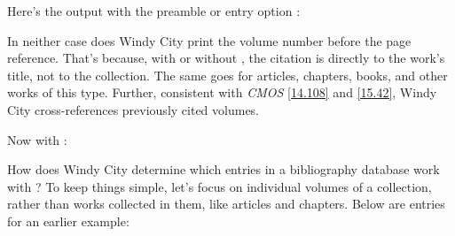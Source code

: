 \documentclass[11pt,letterpaper,oneside]{article}
\begin{document}
\begin{citebib}
\item \cite[169--71]{king2014}
\item \cite[170]{king2014}
\end{citebib}

\noindent Here's the output with the preamble or entry option
:

\begin{citebib}
\item \cite[169--71]{king2014}
\item \cite[170]{king2014}
\end{citebib}

In neither case does Windy City print the volume number before the
page reference. That's because, with or without , the
citation is directly to the work's title, not to the collection. The
same goes for articles, chapters, books, and other works of this type.
Further, consistent with \textit{CMOS} \ref{14.108} and \ref{15.42},
Windy City cross-references previously cited volumes.


\begin{citebib}
\item \cite[56]{doe2018}
\item \cite[128]{adams2018}
\nocite{jones2018}
\end{citebib}

\noindent Now with :

\begin{citebib}
\item \cite[56]{doe2018}
\item \cite[128]{adams2018}
\nocite{jones2018}
\end{citebib}

How does Windy City determine which entries in a bibliography database
work with ? To keep things simple, let's focus on
individual volumes of a collection, rather than works collected in
them, like articles and chapters. Below are entries for an earlier
example:
\end{document}
